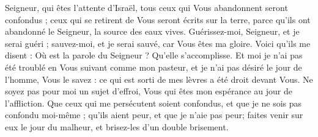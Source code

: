 Seigneur, qui êtes l'attente d'Israël, tous ceux qui Vous abandonnent seront confondus ; ceux qui se retirent de Vous seront écrits sur la terre, parce qu'ils ont abandonné le Seigneur, la source des eaux vives.
Guérissez-moi, Seigneur, et je serai guéri ; sauvez-moi, et je serai sauvé, car Vous êtes ma gloire.
Voici qu'ils me disent : Où est la parole du Seigneur ? Qu'elle s'accomplisse.
Et moi je n'ai pas été troublé en Vous suivant comme mon pasteur, et je n'ai pas désiré le jour de l'homme, Vous le savez : ce qui est sorti de mes lèvres a été droit devant Vous.
Ne soyez pas pour moi un sujet d'effroi, Vous qui êtes mon espérance au jour de l'affliction.
Que ceux qui me persécutent soient confondus, et que je ne sois pas confondu moi-même ; qu'ils aient peur, et que je n'aie pas peur; faites venir sur eux le jour du malheur, et brisez-les d'un double brisement.
